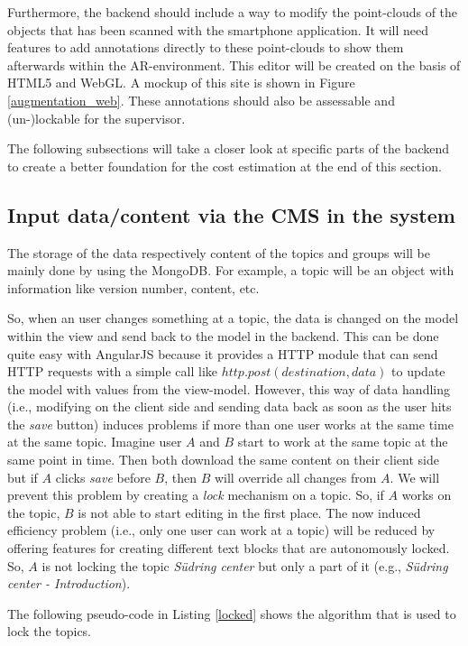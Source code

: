 Furthermore, the backend should include a way to modify the point-clouds of the objects that has been scanned with the smartphone application. It will need features to add annotations directly to these point-clouds to show them afterwards within the \ac{AR}-environment. This editor will be created on the basis of \ac{HTML5} and \ac{WebGL}. A mockup of this site is shown in Figure \ref{augmentation_web}. These annotations should also be assessable and (un-)lockable for the supervisor. 

The following subsections will take a closer look at specific parts of the backend to create a better foundation for the cost estimation at the end of this section. 

\subsection{Input data/content via the \ac{CMS} in the system}
The storage of the data respectively content of the topics and groups will be mainly done by using the MongoDB. For example, a topic will be an object with information like version number, content, etc. 

So, when an user changes something at a topic, the data is changed on the model within the view and send back to the model in the backend. This can be done quite easy with AngularJS because it provides a \ac{HTTP} module that can send \ac{HTTP} requests with a simple call like $http.post(destination,data)$ to update the model with values from the view-model. However, this way of data handling (i.e., modifying on the client side and sending data back as soon as the user hits the \emph{save} button) induces problems if more than one user works at the same time at the same topic. Imagine user $A$ and $B$ start to work at the same topic at the same point in time. Then both download the same content on their client side but if $A$ clicks \emph{save} before $B$, then $B$ will override all changes from $A$. We will prevent this problem by creating a \emph{lock} mechanism on a topic. So, if $A$ works on the topic, $B$ is not able to start editing in the first place. The now induced efficiency problem (i.e., only one user can work at a topic) will be reduced by offering features for creating different text blocks that are autonomously locked. So, $A$ is not locking the topic \emph{S\"udring center} but only a part of it (e.g., \emph{S\"udring center - Introduction}).

The following pseudo-code in Listing \ref{locked} shows the algorithm that is used to lock the topics. 

